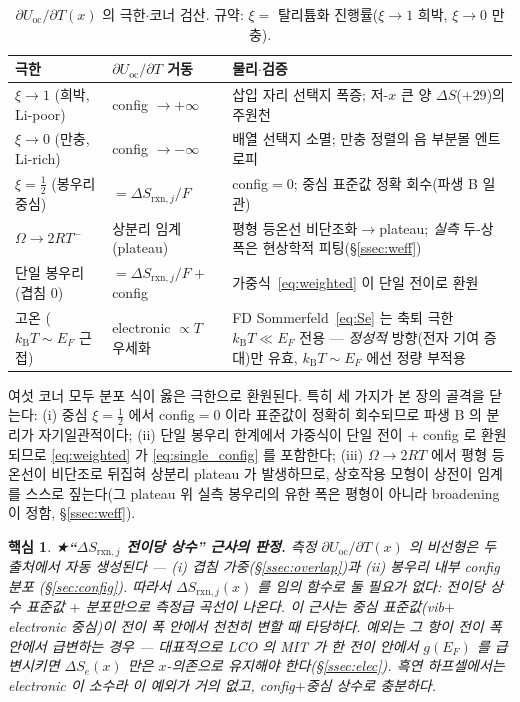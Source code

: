 \documentclass[11pt,a4paper]{article}
\newtheorem*{keybox}{핵심}
\newcommand{\rxn}{\mathrm{rxn}}
\newcommand{\oc}{\mathrm{oc}}
\newcommand{\kB}{k_{\mathrm B}}
\begin{document}
\begin{table}[t]
\centering\small
\renewcommand{\arraystretch}{1.35}
\caption{$\partial U_\oc/\partial T(x)$ 의 극한$\cdot$코너 검산. 규약: $\xi=$ 탈리튬화 진행률($\xi\to1$ 희박, $\xi\to0$ 만충).}
\label{tab:limits}
\begin{tabular}{l l l}
\toprule
극한 & $\partial U_\oc/\partial T$ 거동 & 물리$\cdot$검증 \\
\midrule
$\xi\to1$ (희박, Li-poor) & config $\to+\infty$ & 삽입 자리 선택지 폭증; 저-$x$ 큰 양 $\Delta S$($+29$)의 주원천 \\
$\xi\to0$ (만충, Li-rich) & config $\to-\infty$ & 배열 선택지 소멸; 만충 정렬의 음 부분몰 엔트로피 \\
$\xi=\tfrac12$ (봉우리 중심) & $=\Delta S_{\rxn,j}/F$ & config$=0$; 중심 표준값 정확 회수(파생 B 일관) \\
$\Omega\to2RT^-$ & 상분리 임계(plateau) & 평형 등온선 비단조화$\to$plateau; \emph{실측} 두-상 폭은 현상학적 피팅(\S\ref{ssec:weff}) \\
단일 봉우리 (겹침 0) & $=\Delta S_{\rxn,j}/F+$ config & 가중식~\eqref{eq:weighted} 이 단일 전이로 환원 \\
고온 ($\kB T\!\sim\!E_F$ 근접) & electronic $\propto T$ 우세화 & FD Sommerfeld~\eqref{eq:Se} 는 축퇴 극한 $\kB T\!\ll\!E_F$ 전용 — \emph{정성적} 방향(전자 기여 증대)만 유효, $\kB T\!\sim\!E_F$ 에선 정량 부적용 \\
\bottomrule
\end{tabular}
\end{table}

여섯 코너 모두 분포 식이 옳은 극한으로 환원된다. 특히 세 가지가 본 장의 골격을 닫는다: (i) 중심
$\xi=\tfrac12$ 에서 config$=0$ 이라 표준값이 정확히 회수되므로 파생 B 의 분리가 자기일관적이다; (ii) 단일
봉우리 한계에서 가중식이 단일 전이 $+$ config 로 환원되므로 \eqref{eq:weighted} 가 \eqref{eq:single_config} 를
포함한다; (iii) $\Omega\to2RT$ 에서 평형 등온선이 비단조로 뒤집혀 상분리 plateau 가 발생하므로, 상호작용 모형이
상전이 임계를 스스로 짚는다(그 plateau 위 실측 봉우리의 유한 폭은 평형이 아니라 broadening 이 정함, \S\ref{ssec:weff}).

\begin{keybox}
★\textbf{``$\Delta S_{\rxn,j}$ 전이당 상수'' 근사의 판정.} 측정 $\partial U_\oc/\partial T(x)$ 의 비선형은 두
출처에서 \emph{자동 생성}된다 — (i) 겹침 가중(\S\ref{ssec:overlap})과 (ii) 봉우리 내부 config 분포
(\S\ref{sec:config}). 따라서 $\Delta S_{\rxn,j}(x)$ 를 임의 함수로 둘 필요가 \emph{없다}: 전이당 \emph{상수}
표준값 $+$ 분포만으로 측정급 곡선이 나온다. 이 근사는 \emph{중심 표준값(vib$+$electronic 중심)이 전이 폭 안에서
천천히 변할 때} 타당하다. 예외는 그 항이 전이 폭 \emph{안에서} 급변하는 경우 — 대표적으로 LCO 의 MIT 가 한
전이 안에서 $g(E_F)$ 를 급변시키면 $\Delta S_e(x)$ 만은 $x$-의존으로 유지해야 한다(\S\ref{ssec:elec}). 흑연
하프셀에서는 electronic 이 소수라 이 예외가 거의 없고, config$+$중심 상수로 충분하다.
\end{keybox}
\end{document}
